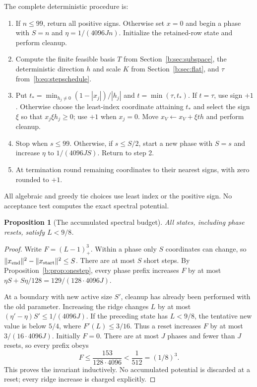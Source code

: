 \documentclass[11pt]{amsart}
\newtheorem{proposition}[theorem]{Proposition}
\theoremstyle{definition}\newtheorem{definition}[theorem]{Definition}
\theoremstyle{remark}\newtheorem{remark}[theorem]{Remark}
\numberwithin{equation}{section}
\begin{document}
The complete deterministic procedure is:
\begin{enumerate}
\item If $n\le99$, return all positive signs. Otherwise set $x=0$ and begin
a phase with $S=n$ and $\eta=1/(4096Jn)$. Initialize the retained-row
state and perform cleanup.
\item Compute the finite feasible basis $T$ from Section~\ref{b:sec:subspace},
the deterministic direction $h$ and scale $K$ from Section~\ref{b:sec:flat},
and $\tau$ from~\eqref{b:eq:stepschedule}.
\item Put $t_* =\min_{h_j\ne0}(1-|x_j|)/|h_j|$ and $t=\min(\tau,t_*)$.
If $t=\tau$, use sign $+1$. Otherwise choose the least-index coordinate
attaining $t_*$ and select the sign $\xi$ so that $x_j\xi h_j\ge0$;
use $+1$ when $x_j=0$.
Move $x_V\leftarrow x_V+\xi t h$ and perform cleanup.
\item Stop when $s\le99$. Otherwise, if $s\le S/2$, start a new phase with
$S=s$ and increase $\eta$ to $1/(4096JS)$. Return to step 2.
\item At termination round remaining coordinates to their nearest signs,
with zero rounded to $+1$.
\end{enumerate}
All algebraic and greedy tie choices use least index or the positive sign.
No acceptance test computes the exact spectral potential.

\begin{proposition}[The accumulated spectral budget]\label{b:prop:budget}
All states, including phase resets, satisfy $L<9/8$.
\end{proposition}
\begin{proof}
Write $F=(L-1)_+^3$. Within a phase only $S$ coordinates can change, so
$\|x_{\rm end}\|^2-\|x_{\rm start}\|^2\le S$.
There are at most $S$ short steps. By Proposition~\ref{b:prop:onestep}, every
phase prefix increases $F$ by at most
$\eta S+S\eta/128=129/(128\cdot4096J)$.

At a boundary with new active size $S'$, cleanup has already been performed
with the old parameter. Increasing the ridge changes $L$ by at most
$(\eta'-\eta)S'\le1/(4096J)$.
If the preceding state has $L<9/8$, the tentative new value is below $5/4$,
where $F'(L)\le3/16$. Thus a reset increases $F$ by at most
$3/(16\cdot4096J)$. Initially $F=0$.
There are at most $J$ phases and fewer than $J$ resets, so every prefix obeys
\[
 F\le\frac{153}{128\cdot4096}<\frac1{512}=(1/8)^3.
\]
This proves the invariant inductively. No accumulated potential is discarded
at a reset; every ridge increase is charged explicitly.
\end{proof}
\end{document}
